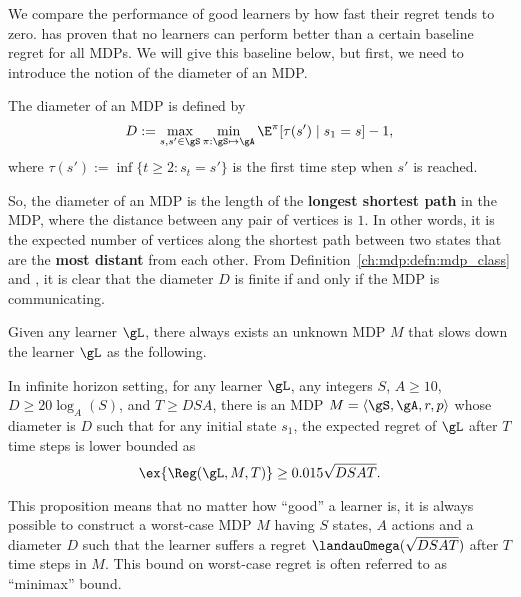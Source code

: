 We compare the performance of good learners by how fast their regret tends to zero.
\cite{jaksch2010near} has proven that no learners can perform better than a certain baseline regret for all MDPs.
We will give this baseline below, but first, we need to introduce the notion of the diameter of an MDP.
\begin{defn}
    \label{ch:rl:defn:diameter}
    The diameter of an MDP is defined by
    \begin{equation}
        \label{eq:diameter}
        D := \max_{s,s'\in\gS}\min_{\pi:\gS\mapsto\gA} \E^\pi[\tau(s') \mid s_1=s] -1,
    \end{equation}
    where $\tau(s'):=\inf\{t\ge2 : s_t=s'\}$ is the first time step when $s'$ is reached.
\end{defn}
So, the diameter of an MDP is the length of the \textbf{longest shortest path} in the MDP, where the distance between any pair of vertices is $1$.
In other words, it is the expected number of vertices along the shortest path between two states that are the \textbf{most distant} from each other.
From Definition~\ref{ch:mdp:defn:mdp_class} and \cite[Proposition~8.3.1]{puterman2014markov}, it is clear that the diameter $D$ is finite if and only if the MDP is communicating.

Given any learner $\gL$, there always exists an unknown MDP $M$ that slows down the learner $\gL$ as the following.
\begin{prop}
    \label{prop:minimax_rg_lb}
    In infinite horizon setting, for any learner $\gL$, any integers $S$, $A\ge10$, $D\ge 20\log_{A}(S)$, and $T\ge DSA$, there is an MDP $M=\langle\gS,\gA,r,p\rangle$ whose diameter is $D$ such that for any initial state $s_1$, the expected regret of $\gL$ after $T$ time steps is lower bounded as
    \begin{equation}
        \label{eq:minimax_rg_lb}
        \ex{\Reg(\gL, M, T)} \ge 0.015\sqrt{DSAT}.
    \end{equation}
\end{prop}
This proposition means that no matter how ``good'' a learner is, it is always possible to construct a worst-case MDP $M$ having $S$ states, $A$ actions and a diameter $D$ such that the learner suffers a regret $\landauOmega(\sqrt{DSAT})$ after $T$ time steps in $M$.
This bound on worst-case regret is often referred to as ``minimax'' bound.

